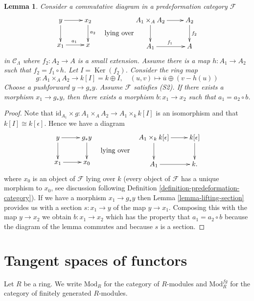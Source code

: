 \documentclass{stacks-project}
\theoremstyle{plain}
\newtheorem{lemma}[subsection]{Lemma}
\theoremstyle{definition}
\theoremstyle{remark}
\numberwithin{equation}{subsection}
\def\Ker{\mathop{\mathrm{Ker}}}
\begin{document}
\begin{lemma}
\label{lemma-lifting-along-small-extension}
Consider a commutative diagram in a predeformation category $\mathcal{F}$
$$
\vcenter{
\xymatrix{
y \ar[r] \ar[d] & x_2 \ar[d]^{a_2} \\
x_1 \ar[r]^{a_1}        & x
}
}
\quad\text{lying over}
\vcenter{
\xymatrix{
A_1 \times_A A_2 \ar[r] \ar[d] & A_2 \ar[d]^{f_2} \\
A_1 \ar[r]^{f_1} & A
}
}
$$
in $\mathcal{C}_\Lambda$ where
$f_2 : A_2 \to A$ is a small extension.
Assume there is a map $h : A_1 \to A_2$ such that $f_2 = f_1 \circ h$.
Let $I = \Ker(f_2)$. Consider the ring map
$$
g : A_1 \times_A A_2 \longrightarrow k[I] = k \oplus I, \quad
(u, v) \longmapsto \overline{u} \oplus (v - h(u))
$$
Choose a pushforward $y \to g_*y$. Assume $\mathcal{F}$ satisfies (S2).
If there exists a morphism $x_1 \to g_*y$, then there exists a
morphism $b: x_1 \to x_2$ such that $a_1 =  a_2 \circ b$.
\end{lemma}

\begin{proof}
Note that
$\text{id}_{A_1} \times g : A_1 \times_A A_2 \to A_1 \times_k k[I]$
is an isomorphism and that $k[I] \cong k[\epsilon]$. Hence we have a diagram
$$
\vcenter{
\xymatrix{
y \ar[r] \ar[d] & g_*y \ar[d] \\
x_1 \ar[r]        & x_0
}
}
\quad\text{lying over}\quad
\vcenter{
\xymatrix{
A_1 \times_k k[\epsilon] \ar[r] \ar[d] & k[\epsilon] \ar[d] \\
A_1 \ar[r] & k.
}
}
$$
where $x_0$ is an object of $\mathcal{F}$ lying over $k$ (every object
of $\mathcal{F}$ has a unique morphism to $x_0$, see
discussion following Definition \ref{definition-predeformation-category}).
If we have a morphism $x_1 \to g_*y$ then
Lemma \ref{lemma-lifting-section}
provides us with a section $s : x_1 \to y$ of the map $y \to x_1$.
Composing this with the map $y \to x_2$ we obtain $b : x_1 \to x_2$
which has the property that $a_1 =  a_2 \circ b$ because
the diagram of the lemma commutes and because $s$ is a section.
\end{proof}





\section{Tangent spaces of functors}
\label{section-tangent-spaces-functors}

\noindent
Let $R$ be a ring. We write $\text{Mod}_R$ for the category of
$R$-modules and $\text{Mod}^{fg}_R$ for the category of finitely
generated $R$-modules.
\end{document}
